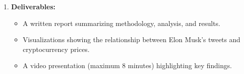 \documentclass[12pt]{article}
\begin{document}
\begin{enumerate}[label=\arabic*.]
    \item \textbf{Deliverables:}  
    \begin{itemize}
        \item A written report summarizing methodology, analysis, and results.
        \item Visualizations showing the relationship between Elon Musk's tweets and cryptocurrency prices.
        \item A video presentation (maximum 8 minutes) highlighting key findings.
    \end{itemize}
\end{enumerate}
\end{document}
